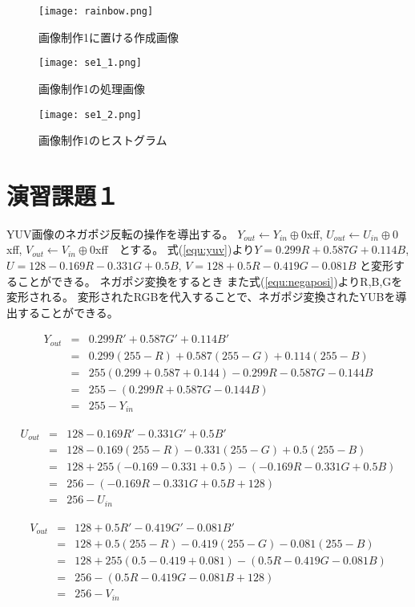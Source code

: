 \documentclass[a4j]{jsarticle}
\begin{document}
\begin{figure}
  \centering
  \texttt{[image: rainbow.png]}
  \caption{画像制作1に置ける作成画像}
  \label{pic:se1_0}
\end{figure}
\begin{figure}
  \centering
  \texttt{[image: se1\_1.png]}
  \caption{画像制作1の処理画像}
  \label{pic:se1_1}
\end{figure}
\begin{figure}
  \centering
  \texttt{[image: se1\_2.png]}
  \caption{画像制作1のヒストグラム}
  \label{pic:se1_2}
\end{figure}

\clearpage
\onecolumn

\section{演習課題１}
YUV画像のネガポジ反転の操作を導出する。
$Y_{out}←Y_{in}\oplus0$xff, $U_{out}←U_{in}\oplus0$xff, $V_{out}←V_{in}\oplus0$xff　とする。
式(\ref{equ:yuv})より$Y = 0.299R + 0.587G + 0.114B$,
$ U = 128 - 0.169R - 0.331G + 0.5B$,
$V = 128 + 0.5R - 0.419G - 0.081B$
と変形することができる。
ネガポジ変換をするとき
また式(\ref{equ:negaposi})よりR,B,Gを変形される。
変形されたRGBを代入することで、ネガポジ変換されたYUBを導出することができる。



\begin{eqnarray*}
  Y_{out} &=& 0.299R' + 0.587G' + 0.114B'\\
  &=& 0.299(255 -R) + 0.587(255 -G) + 0.114(255 -B)\\
  &=& 255(0.299 + 0.587 + 0.144) -0.299R -0.587G -0.144B\\
  &=& 255  -(0.299R + 0.587G -0.144B)\\
  &=& 255 -Y_{in}
\end{eqnarray*}

\begin{eqnarray*}
  U_{out} &=& 128 - 0.169R' - 0.331G' + 0.5B'\\
  &=& 128 - 0.169(255 -R) - 0.331(255 - G) + 0.5(255 - B)\\
  &=& 128+255(-0.169-0.331+0.5)-(-0.169R-0.331G+ 0.5B) \\
  &=& 256 - (- 0.169R - 0.331G + 0.5B + 128) \\
  &=& 256 -U_{in}
\end{eqnarray*}

\begin{eqnarray*}
  V_{out} &=& 128 + 0.5R' - 0.419G' - 0.081B'\\
  &=& 128 + 0.5(255 -R) - 0.419(255 - G) - 0.081(255 - B)\\
  &=& 128 + 255(0.5 - 0.419 + 0.081) - (0.5R - 0.419G - 0.081B) \\
  &=& 256 - (0.5R - 0.419G - 0.081B + 128) \\
  &=& 256 -V_{in}
\end{eqnarray*}
\end{document}
